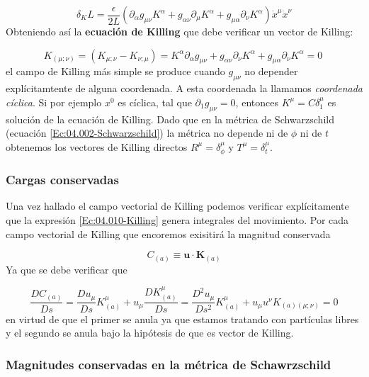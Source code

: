 \documentclass[12pt,a4paper]{book}
\numberwithin{equation}{section}
\numberwithin{figure}{section}
\newcommand{\parentesis}[1]{\left( #1  \right)}
\newcommand{\un}{\mathbf{u}}
\newcommand{\Kn}{\mathbf{K}}
\begin{document}
\begin{equation}
\delta_K L = \frac{\epsilon}{2L} \parentesis{\partial_\alpha g_{\mu \nu} K^\alpha + g_{\alpha \nu} \partial_\mu K^\alpha + g_{\mu \alpha} \partial_\nu K^\alpha} \dot{x}^\mu \dot{x}^\nu
\end{equation}
Obteniendo así la \textbf{ecuación de Killing} que debe verificar un vector de Killing:

\begin{equation}
K_{(\mu ;\nu)} = \parentesis{K_{\mu;\nu} - K_{\nu;\mu}} = K^\alpha \partial_\alpha g_{\mu \nu} + g_{\alpha \nu} \partial_\nu K^\alpha + g_{\mu \alpha} \partial_\nu K^\alpha = 0 \ \label{Ec:04.010-Killing}
\end{equation}
el campo de Killing más simple se produce cuando $g_{\mu \nu}$ no depender explícitamtente de alguna coordenada. A esta coordenada la llamamos \textit{coordenada cíclica}. Si por ejemplo $x^0$ es cíclica, tal que $\partial_1 g_{\mu \nu}= 0$, entonces $K^\mu = C \delta ^\mu_1$ es solución de la ecuación de Killing.  Dado que en la métrica de Schwarzschild (ecuación \ref{Ec:04.002-Schwarzschild}) la métrica no depende ni de $\phi$ ni de $t$ obtenemos los vectores de Killing directos  $R^\mu = \delta^\mu_\phi$ y  $T^\mu = \delta^\mu_t$.




\subsubsection{Cargas conservadas}

Una vez hallado el campo vectorial de Killing podemos verificar explícitamente que la expresión \ref{Ec:04.010-Killing} genera integrales del movimiento. Por cada campo vectorial de Killing que encoremos exisitirá la magnitud conservada

\begin{equation}
C_{(a)} \equiv \un \cdot \Kn_{(a)}
\end{equation}
Ya que se debe verificar que

\begin{equation}
\frac{D C_{(a)}}{D s} = \frac{D u_\mu}{D s} K^\mu_{(a)} + u_\mu \frac{D K^\mu_{(a)}}{D s} =  \frac{D^2 u_\mu}{D s^2} K^\mu_{(a)} + u_\mu u^\nu K_{(a) (\mu;\nu)} = 0 
\end{equation}
en virtud de que el primer se anula ya que estamos tratando con partículas libres y el segundo se anula bajo la hipótesis de que es vector de Killing.


\subsubsection{Magnitudes conservadas en la métrica de Schawrzschild}
\end{document}

